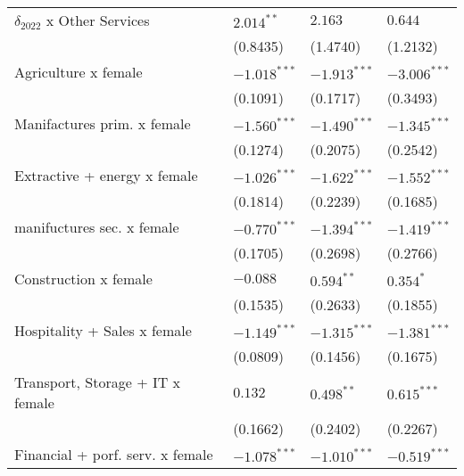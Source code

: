 \begin{tabular}{llll}
$\delta_{2022}$ x Other Services                   &       $2.014^{**}$ &            $2.163$ &            $0.644$ \\
                                                   &           (0.8435) &           (1.4740) &           (1.2132) \\
Agriculture x female                               &     $-1.018^{***}$ &     $-1.913^{***}$ &     $-3.006^{***}$ \\
                                                   &           (0.1091) &           (0.1717) &           (0.3493) \\
Manifactures prim. x female                        &     $-1.560^{***}$ &     $-1.490^{***}$ &     $-1.345^{***}$ \\
                                                   &           (0.1274) &           (0.2075) &           (0.2542) \\
Extractive + energy x female                       &     $-1.026^{***}$ &     $-1.622^{***}$ &     $-1.552^{***}$ \\
                                                   &           (0.1814) &           (0.2239) &           (0.1685) \\
manifuctures sec. x female                         &     $-0.770^{***}$ &     $-1.394^{***}$ &     $-1.419^{***}$ \\
                                                   &           (0.1705) &           (0.2698) &           (0.2766) \\
Construction x female                              &           $-0.088$ &       $0.594^{**}$ &          $0.354^*$ \\
                                                   &           (0.1535) &           (0.2633) &           (0.1855) \\
Hospitality + Sales x female                       &     $-1.149^{***}$ &     $-1.315^{***}$ &     $-1.381^{***}$ \\
                                                   &           (0.0809) &           (0.1456) &           (0.1675) \\
Transport, Storage + IT x female                   &            $0.132$ &       $0.498^{**}$ &      $0.615^{***}$ \\
                                                   &           (0.1662) &           (0.2402) &           (0.2267) \\
Financial + porf. serv. x female                   &     $-1.078^{***}$ &     $-1.010^{***}$ &     $-0.519^{***}$ \\

\end{tabular}
